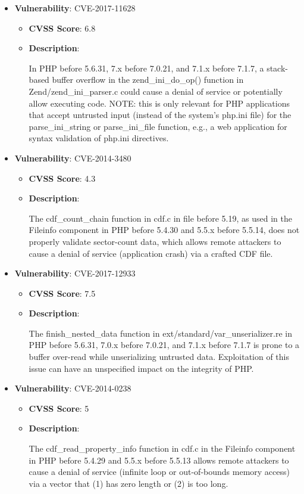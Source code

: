 \documentclass{article}
\begin{document}
\begin{itemize}
        \item \textbf{Vulnerability}: CVE-2017-11628
        \begin{itemize}
            \item \textbf{CVSS Score}:  6.8 
            \item \textbf{Description}:
            \parbox[t]{0.9\linewidth}{
                \ttfamily In PHP before 5.6.31, 7.x before 7.0.21, and 7.1.x before 7.1.7, a stack-based buffer overflow in the zend\_ini\_do\_op() function in Zend/zend\_ini\_parser.c could cause a denial of service or potentially allow executing code. NOTE: this is only relevant for PHP applications that accept untrusted input (instead of the system's php.ini file) for the parse\_ini\_string or parse\_ini\_file function, e.g., a web application for syntax validation of php.ini directives.
            }
        \end{itemize}
    
        \item \textbf{Vulnerability}: CVE-2014-3480
        \begin{itemize}
            \item \textbf{CVSS Score}:  4.3 
            \item \textbf{Description}:
            \parbox[t]{0.9\linewidth}{
                \ttfamily The cdf\_count\_chain function in cdf.c in file before 5.19, as used in the Fileinfo component in PHP before 5.4.30 and 5.5.x before 5.5.14, does not properly validate sector-count data, which allows remote attackers to cause a denial of service (application crash) via a crafted CDF file.
            }
        \end{itemize}
    
        \item \textbf{Vulnerability}: CVE-2017-12933
        \begin{itemize}
            \item \textbf{CVSS Score}:  7.5 
            \item \textbf{Description}:
            \parbox[t]{0.9\linewidth}{
                \ttfamily The finish\_nested\_data function in ext/standard/var\_unserializer.re in PHP before 5.6.31, 7.0.x before 7.0.21, and 7.1.x before 7.1.7 is prone to a buffer over-read while unserializing untrusted data. Exploitation of this issue can have an unspecified impact on the integrity of PHP.
            }
        \end{itemize}
    
        \item \textbf{Vulnerability}: CVE-2014-0238
        \begin{itemize}
            \item \textbf{CVSS Score}:  5 
            \item \textbf{Description}:
            \parbox[t]{0.9\linewidth}{
                \ttfamily The cdf\_read\_property\_info function in cdf.c in the Fileinfo component in PHP before 5.4.29 and 5.5.x before 5.5.13 allows remote attackers to cause a denial of service (infinite loop or out-of-bounds memory access) via a vector that (1) has zero length or (2) is too long.
            }
        \end{itemize}
    

\end{itemize}
\end{document}
